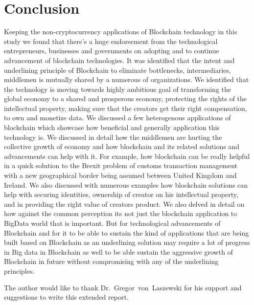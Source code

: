 \section{Conclusion}
Keeping the non-cryptocurrency applications of Blockchain technology in this study we found that there's a huge endorsement from the technological entrepreneurs, businesses and governments on adopting and to continue advancement of blockchain technologies. It was identified that the intent and underlining principle of Blockchain to eliminate bottlenecks, intermediaries, middlemen is mutually shared by a numerous of organizations. We identified that the technology is moving towards highly ambitious goal of transforming the global economy to a shared and prosperous economy, protecting the rights of the intellectual property, making sure that the creators get their right compensation, to own and monetize data. We discussed a few heterogenous applications of blockchain which showcase how beneficial and generally application this technology is. We discussed in detail how the middlemen are hurting the collective growth of economy and how blockchain and its related solutions and advancements can help with it. For example, how blockchain can be really helpful in a quick solution to the Brexit problem of customs transaction management with a new geographical border being assumed between United Kingdom and Ireland. We also discussed with numerous examples how blockchain solutions can help with securing identities, ownership of creator on his intellectual property, and in providing the right value of creators product. We also delved in detail on how against the common perception its not just the blockchain application to BigData world that is important. But for technological advancements of Blockchain and for it to be able to sustain the kind of applications that are being built based on Blockchain as an underlining solution may require a lot of progress in Big data in Blockchain as well to be able sustain the aggressive growth of Blockchain in future without compromising with any of the underlining principles.


\begin{acks}

The author would like to thank Dr.~Gregor~von~Laszewski for his
support and suggestions to write this extended report.

\end{acks}



